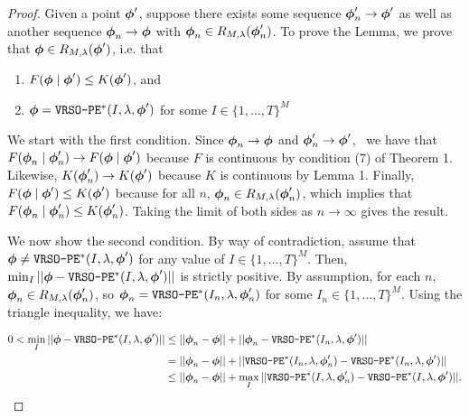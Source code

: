 \begin{proof}
     Given a point $\boldsymbol{\phi}'$, suppose there exists some sequence $\boldsymbol{\phi}'_{n} \to \boldsymbol{\phi}'$ as well as another sequence $\boldsymbol{\phi}_{n} \to \boldsymbol{\phi}$ with $\boldsymbol{\phi}_{n} \in R_{M,\lambda}(\boldsymbol{\phi}'_{n})$. To prove the Lemma, we prove that $\boldsymbol{\phi} \in R_{M,\lambda}(\boldsymbol{\phi}')$, i.e. that
    \begin{enumerate}
        \item $F(\boldsymbol{\phi} \mid \boldsymbol{\phi}') \leq K(\boldsymbol{\phi}')$, and
        \item $\boldsymbol{\phi} = \texttt{VRSO-PE}^*(I,\lambda,\boldsymbol{\phi}')$ for some $I \in \{1,\ldots,T\}^M$
    \end{enumerate}
    We start with the first condition. Since $\boldsymbol{\phi}_{n} \to \boldsymbol{\phi}$ and $\boldsymbol{\phi}'_{n} \to \boldsymbol{\phi}'$,  \ we have that $F(\boldsymbol{\phi}_{n} \mid \boldsymbol{\phi}'_{n}) \to F(\boldsymbol{\phi} \mid \boldsymbol{\phi}')$ because $F$ is continuous by condition (7) of Theorem 1. Likewise, $K(\boldsymbol{\phi}'_{n}) \to K(\boldsymbol{\phi}')$ because $K$ is continuous by Lemma 1. Finally, $F(\boldsymbol{\phi} \mid \boldsymbol{\phi}') \leq K(\boldsymbol{\phi}')$ because for all $n$, $\boldsymbol{\phi}_n \in R_{M,\lambda}(\boldsymbol{\phi}_n')$, which implies that $F(\boldsymbol{\phi}_{n} \mid \boldsymbol{\phi}'_{n}) \leq K(\boldsymbol{\phi}'_{n})$. Taking the limit of both sides as $n \to \infty$ gives the result.
    
    We now show the second condition. By way of contradiction, assume that $\boldsymbol{\phi} \neq \texttt{VRSO-PE}^*(I,\lambda,\boldsymbol{\phi}')$ for any value of $I \in \{1,\ldots,T\}^M$. Then, $\min_I ||\boldsymbol{\phi} - \texttt{VRSO-PE}^*(I,\lambda,\boldsymbol{\phi}')||$ is strictly positive. 
    By assumption, for each $n$, $\boldsymbol{\phi}_{n} \in R_{M,\lambda}(\boldsymbol{\phi}'_{n})$, so $\boldsymbol{\phi}_{n} = \texttt{VRSO-PE}^*(I_n,\lambda,\boldsymbol{\phi}'_{n})$ for some $I_n \in \{1,\ldots,T\}^M$. %
    Using the triangle inequality, we have:

    \begin{align}
        0 < \min_{I}||\boldsymbol{\phi} - \texttt{VRSO-PE}^*(I,\lambda,\boldsymbol{\phi}')|| &\leq ||\boldsymbol{\phi}_{n} - \boldsymbol{\phi}|| + ||\boldsymbol{\phi}_{n} - \texttt{VRSO-PE}^*(I_n,\lambda,\boldsymbol{\phi}')|| \\
        &= ||\boldsymbol{\phi}_{n} - \boldsymbol{\phi}|| + ||\texttt{VRSO-PE}^*(I_n,\lambda,\boldsymbol{\phi}'_{n}) - \texttt{VRSO-PE}^*(I_n,\lambda,\boldsymbol{\phi}')|| \\
        &\leq ||\boldsymbol{\phi}_{n} - \boldsymbol{\phi}|| + \max_{I} ||\texttt{VRSO-PE}^*(I,\lambda,\boldsymbol{\phi}'_{n}) - \texttt{VRSO-PE}^*(I,\lambda,\boldsymbol{\phi}')||.
    \end{align}
    

\end{proof}

